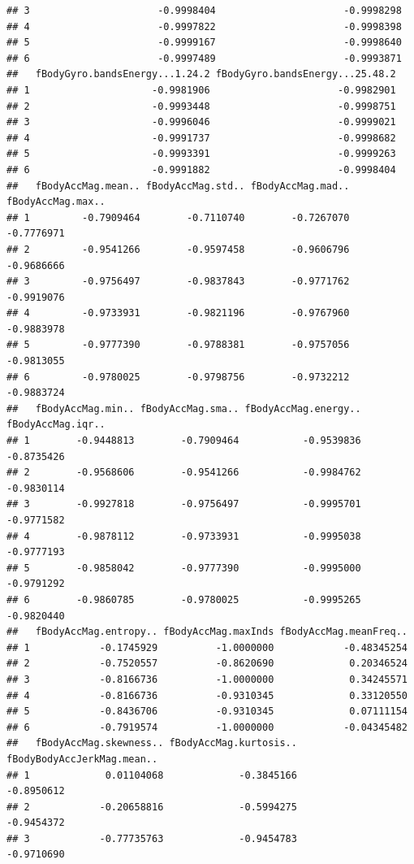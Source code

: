 \documentclass[
]{article}
\begin{document}
\begin{verbatim}
## 3                      -0.9998404                      -0.9998298
## 4                      -0.9997822                      -0.9998398
## 5                      -0.9999167                      -0.9998640
## 6                      -0.9997489                      -0.9993871
##   fBodyGyro.bandsEnergy...1.24.2 fBodyGyro.bandsEnergy...25.48.2
## 1                     -0.9981906                      -0.9982901
## 2                     -0.9993448                      -0.9998751
## 3                     -0.9996046                      -0.9999021
## 4                     -0.9991737                      -0.9998682
## 5                     -0.9993391                      -0.9999263
## 6                     -0.9991882                      -0.9998404
##   fBodyAccMag.mean.. fBodyAccMag.std.. fBodyAccMag.mad.. fBodyAccMag.max..
## 1         -0.7909464        -0.7110740        -0.7267070        -0.7776971
## 2         -0.9541266        -0.9597458        -0.9606796        -0.9686666
## 3         -0.9756497        -0.9837843        -0.9771762        -0.9919076
## 4         -0.9733931        -0.9821196        -0.9767960        -0.9883978
## 5         -0.9777390        -0.9788381        -0.9757056        -0.9813055
## 6         -0.9780025        -0.9798756        -0.9732212        -0.9883724
##   fBodyAccMag.min.. fBodyAccMag.sma.. fBodyAccMag.energy.. fBodyAccMag.iqr..
## 1        -0.9448813        -0.7909464           -0.9539836        -0.8735426
## 2        -0.9568606        -0.9541266           -0.9984762        -0.9830114
## 3        -0.9927818        -0.9756497           -0.9995701        -0.9771582
## 4        -0.9878112        -0.9733931           -0.9995038        -0.9777193
## 5        -0.9858042        -0.9777390           -0.9995000        -0.9791292
## 6        -0.9860785        -0.9780025           -0.9995265        -0.9820440
##   fBodyAccMag.entropy.. fBodyAccMag.maxInds fBodyAccMag.meanFreq..
## 1            -0.1745929          -1.0000000            -0.48345254
## 2            -0.7520557          -0.8620690             0.20346524
## 3            -0.8166736          -1.0000000             0.34245571
## 4            -0.8166736          -0.9310345             0.33120550
## 5            -0.8436706          -0.9310345             0.07111154
## 6            -0.7919574          -1.0000000            -0.04345482
##   fBodyAccMag.skewness.. fBodyAccMag.kurtosis.. fBodyBodyAccJerkMag.mean..
## 1             0.01104068             -0.3845166                 -0.8950612
## 2            -0.20658816             -0.5994275                 -0.9454372
## 3            -0.77735763             -0.9454783                 -0.9710690

\end{verbatim}
\end{document}
